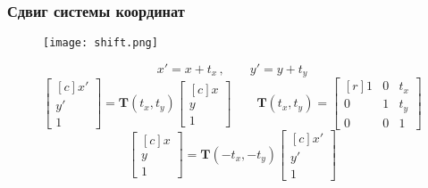\documentclass[
    12pt, 
    usepdftitle=false,
    aspectratio=1610
]{beamer}
\begin{document}
\begin{frame}
    \frametitle{Сдвиг системы координат}
    \begin{figure}[t]
        \texttt{[image: shift.png]}
    \end{figure}
    $$
        x' = x + t_x\,,\qquad
        y' = y + t_y
    $$
    $$
        \begin{bmatrix*}[c]
            x' \\ y' \\ 1    
        \end{bmatrix*}=
        \mathbf{T}(t_x,t_y)
        \begin{bmatrix*}[c]
            x \\ y \\ 1    
        \end{bmatrix*}
        \qquad
        \mathbf{T}(t_x,t_y)=
        \begin{bmatrix*}[r]
            1 & 0 & t_x \\
            0 & 1 & t_y \\
            0 & 0 & 1
        \end{bmatrix*}
    $$
    $$
        \begin{bmatrix*}[c]
            x \\ y \\ 1    
        \end{bmatrix*}=
        \mathbf{T}(-t_x,-t_y)
        \begin{bmatrix*}[c]
            x' \\ y' \\ 1    
        \end{bmatrix*}
    $$
\end{frame}
\end{document}
